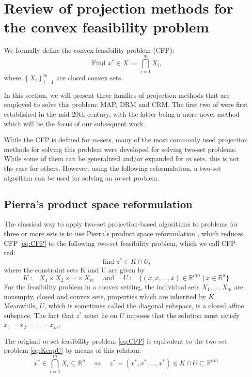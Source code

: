 \documentclass[smallextended,numbook,nospthms]{svjour3}
\theoremstyle{plain}
\theoremstyle{definition}
\def\RR{\mathds R}
\begin{document}
\newpage
\section{Review of projection methods for the convex feasibility problem}\label{sec:proj methods}

We formally define the convex feasibility problem (CFP):
\begin{equation}\label{eq:CFP}
	\text{ Find } x^{*} \in X:=\bigcap_{i=1}^{m} X_{i},
\end{equation}
where $\left\{X_{i}\right\}_{i=1}^{m}$ are closed convex sets.

In this section, we will present three families of projection methods that are employed to solve this problem: MAP, DRM and CRM. The first two of were first established in the mid 20th century, with the latter being a more novel method which will be the focus of our subsequent work.

While the CFP is defined for $m$-sets, many of the most commonly used projection methods for solving this problem were developed for solving two-set problems. While some of them can be generalized and/or expanded for $m$ sets, this is not the case for others. However, using the following reformulation, a two-set algorithm can be used for solving an $m$-set problem.

\subsection{Pierra's product space reformulation}\label{subsec:Pierra}
The classical way to apply two-set projection-based algorithms to problems for three or more sets is to use Pierra's product space reformulation \cite{Pierra:1984hl}, which reduces CFP \cref{eq:CFP} to the following two-set feasibility problem, which we call CFP-red:
\[
\text{ find } z^{*}\in K\cap U,  \label{eq:KcapU}
\]
where the constraint sets $\mathrm{K}$ and $\mathrm{U}$ are given by
\[
K:=X_{1} \times X_{2} \times \cdots \times X_{m} \quad \text { and } \quad U:=\{(x, x, \ldots, x) \in \RR^{mn} \mid x \in \RR^{n}\}
\]
For the feasibility problem in a convex setting, the individual sets $X_{1}, \ldots, X_{m}$ are nonempty, closed and convex sets, properties which are inherited by $K$. Meanwhile, $U$, which is sometimes called the diagonal subspace, is a closed affine subspace. The fact that $z^*$ must lie on $U$ imposes that the solution must satisfy $x_{1}=x_{2}=\dots=x_{m}$.

The original $m$-set feasibility problem \cref{eq:CFP} is equivalent to the two-set problem \cref{eq:KcapU} by means of this relation:
\begin{equation}
	x^{*} \in \bigcap_{i=1}^{m} X_{i} \subseteq \RR^n \quad \iff \quad z^{*}=(x^{*}, x^{*}, \ldots, x^{*}) \in K \cap U \subseteq \RR^{nm} \label{eq:Pierra}
\end{equation}
\end{document}
